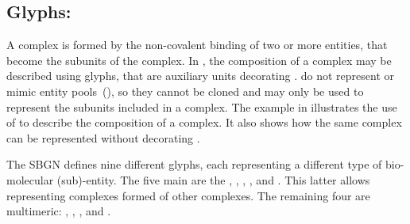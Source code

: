 \subsection{Glyphs: }
\label{sec:subunit}

A complex is formed by the non-covalent binding of two or more entities, that become the subunits of the complex.
In \PD, the composition of a complex may be described using  glyphs, that are auxiliary units decorating .
 do not represent or mimic entity pools~(), so they cannot be cloned and may only be used to represent the subunits included in a complex.
The example in  illustrates the use of  to describe the composition of a complex.
It also shows how the same complex can be represented without decorating .

The SBGN \PD defines nine different  glyphs, each representing a different type of bio-molecular (sub)-entity.
The five main  are the , , , , and .
This latter  allows representing complexes formed of other complexes.
The remaining four  are multimeric: , , , and .

